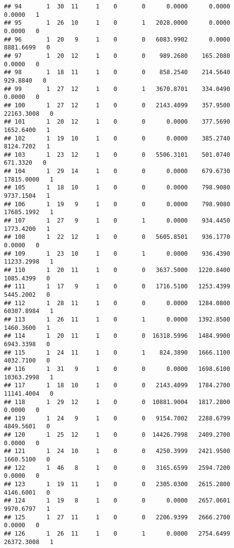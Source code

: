 \documentclass[
]{article}
\begin{document}
\begin{enumerate}
\begin{verbatim}
## 94       1  30  11     1    0       0      0.0000      0.0000      0.0000   1
## 95       1  26  10     1    0       1   2028.0000      0.0000      0.0000   0
## 96       1  20   9     1    0       0   6083.9902      0.0000   8881.6699   0
## 97       1  20  12     1    0       0    989.2680    165.2080      0.0000   0
## 98       1  18  11     1    0       0    858.2540    214.5640    929.8840   0
## 99       1  27  12     1    0       1   3670.8701    334.0490      0.0000   0
## 100      1  27  12     1    0       0   2143.4099    357.9500  22163.3008   0
## 101      1  20  12     1    0       0      0.0000    377.5690   1652.6400   1
## 102      1  19  10     1    0       0      0.0000    385.2740   8124.7202   1
## 103      1  23  12     1    0       0   5506.3101    501.0740    671.3320   0
## 104      1  29  14     1    0       0      0.0000    679.6730  17815.0000   1
## 105      1  18  10     1    0       0      0.0000    798.9080   9737.1504   1
## 106      1  19   9     1    0       0      0.0000    798.9080  17685.1992   1
## 107      1  27   9     1    0       1      0.0000    934.4450   1773.4200   1
## 108      1  22  12     1    0       0   5605.8501    936.1770      0.0000   0
## 109      1  23  10     1    0       1      0.0000    936.4390  11233.2998   1
## 110      1  20  11     1    0       0   3637.5000   1220.8400   1085.4399   0
## 111      1  17   9     1    0       0   1716.5100   1253.4399   5445.2002   0
## 112      1  28  11     1    0       0      0.0000   1284.0800  60307.8984   1
## 113      1  26  11     1    0       1      0.0000   1392.8500   1460.3600   1
## 114      1  20  11     1    0       0  16318.5996   1484.9900   6943.3398   0
## 115      1  24  11     1    0       1    824.3890   1666.1100   4032.7100   0
## 116      1  31   9     1    0       0      0.0000   1698.6100  10363.2998   1
## 117      1  18  10     1    0       0   2143.4099   1784.2700  11141.4004   0
## 118      1  29  12     1    0       0  10881.9004   1817.2800      0.0000   0
## 119      1  24   9     1    0       0   9154.7002   2288.6799   4849.5601   0
## 120      1  25  12     1    0       0  14426.7998   2409.2700      0.0000   0
## 121      1  24  10     1    0       0   4250.3999   2421.9500   1660.5100   0
## 122      1  46   8     1    0       0   3165.6599   2594.7200      0.0000   0
## 123      1  19  11     1    0       0   2305.0300   2615.2800   4146.6001   0
## 124      1  19   8     1    0       0      0.0000   2657.0601   9970.6797   1
## 125      1  27  11     1    0       0   2206.9399   2666.2700      0.0000   0
## 126      1  26  11     1    0       1      0.0000   2754.6499  26372.3008   1

\end{verbatim}
\end{enumerate}
\end{document}
